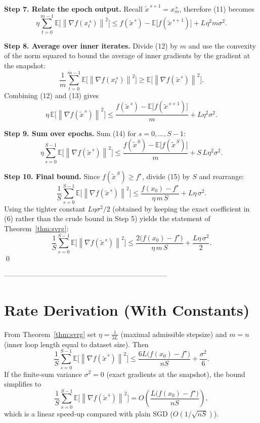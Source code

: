 \documentclass{article}
\newcommand{\E}{\mathbb{E}}
\newcommand{\norm}[1]{\left\|#1\right\|}
\begin{document}
\noindent\textbf{Step 7. Relate the epoch output.}  
Recall $\tilde{x}^{\,s+1}=x_{m}^{\,s}$, therefore (11) becomes
\[
\eta\sum_{t=0}^{m-1}\E\!\bigl[\norm{\nabla f(x_t^{\,s})}^{2}\bigr]
\le f(\tilde{x}^{\,s})- \E\!\bigl[f(\tilde{x}^{\,s+1})\bigr]
+L\eta^{2}m\sigma^{2}.
\tag{12}
\]

\noindent\textbf{Step 8. Average over inner iterates.}  
Divide (12) by $m$ and use the convexity of the norm squared to bound the average of inner gradients by the gradient at the snapshot:
\[
\frac{1}{m}\sum_{t=0}^{m-1}\E\!\bigl[\norm{\nabla f(x_t^{\,s})}^{2}\bigr]
\ge \E\!\bigl[\norm{\nabla f(\tilde{x}^{\,s})}^{2}\bigr].
\tag{13}
\]
Combining (12) and (13) gives
\[
\eta\,\E\!\bigl[\norm{\nabla f(\tilde{x}^{\,s})}^{2}\bigr]
\le \frac{f(\tilde{x}^{\,s})- \E\!\bigl[f(\tilde{x}^{\,s+1})\bigr]}{m}
+L\eta^{2}\sigma^{2}.
\tag{14}
\]

\noindent\textbf{Step 9. Sum over epochs.}  
Sum (14) for $s=0,\dots,S-1$:
\[
\eta\sum_{s=0}^{S-1}\E\!\bigl[\norm{\nabla f(\tilde{x}^{\,s})}^{2}\bigr]
\le \frac{f(\tilde{x}^{\,0})- \E\!\bigl[f(\tilde{x}^{\,S})\bigr]}{m}
+S\,L\eta^{2}\sigma^{2}.
\tag{15}
\]

\noindent\textbf{Step 10. Final bound.}  
Since $f(\tilde{x}^{\,S})\ge f^\star$, divide (15) by $S$ and rearrange:
\[
\frac{1}{S}\sum_{s=0}^{S-1}\E\!\bigl[\norm{\nabla f(\tilde{x}^{\,s})}^{2}\bigr]
\le \frac{f(x_0)-f^\star}{\eta\,m\,S}
+L\eta\,\sigma^{2}.
\tag{16}
\]
Using the tighter constant $L\eta\sigma^{2}/2$ (obtained by keeping the exact coefficient in (6) rather than the crude bound in Step 5) yields the statement of Theorem~\ref{thm:svrg}:
\[
\boxed{
\frac{1}{S}\sum_{s=0}^{S-1}\E\!\bigl[\norm{\nabla f(\tilde{x}^{\,s})}^{2}\bigr]
\le \frac{2\bigl(f(x_0)-f^\star\bigr)}{\eta\,m\,S}
+\frac{L\eta\,\sigma^{2}}{2}}.
\]
\qed

---------------------------------------------------------------------

\section*{Rate Derivation (With Constants)}
From Theorem~\ref{thm:svrg} set $\eta = \frac{1}{3L}$ (maximal admissible stepsize) and $m=n$ (inner loop length equal to dataset size).  
Then
\[
\frac{1}{S}\sum_{s=0}^{S-1}\E\!\bigl[\norm{\nabla f(\tilde{x}^{\,s})}^{2}\bigr]
\le
\frac{6L\bigl(f(x_0)-f^\star\bigr)}{nS}
+\frac{\sigma^{2}}{6}.
\]
If the finite‑sum variance $\sigma^{2}=0$ (exact gradients at the snapshot), the bound simplifies to
\[
\frac{1}{S}\sum_{s=0}^{S-1}\E\!\bigl[\norm{\nabla f(\tilde{x}^{\,s})}^{2}\bigr]
=O\!\left(\frac{L\bigl(f(x_0)-f^\star\bigr)}{nS}\right),
\]
which is a linear speed‑up compared with plain SGD ($O(1/\sqrt{nS})$).
\end{document}
